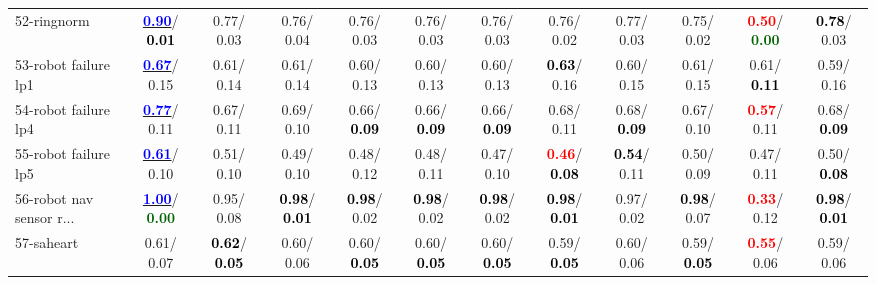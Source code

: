 \begin{table}[h]
\begin{center}
{\begin{tabular}{lc|c|c|c|c|c|c|c|c|c|c}
52-ringnorm & \underline{\textcolor{blue}{\textbf{  0.90}}}/\textcolor{black}{\textbf{  0.01}} &   0.77/  0.03 &   0.76/  0.04 &   0.76/  0.03 &   0.76/  0.03 &   0.76/  0.03 &   0.76/  0.02 &   0.77/  0.03 &   0.75/  0.02 & \textcolor{red}{\textbf{  0.50}}/\textcolor{darkgreen}{\textbf{  0.00}} & \textcolor{black}{\textbf{  0.78}}/  0.03 \\
53-robot failure lp1 & \underline{\textcolor{blue}{\textbf{  0.67}}}/  0.15 &   0.61/  0.14 &   0.61/  0.14 &   0.60/  0.13 &   0.60/  0.13 &   0.60/  0.13 & \textcolor{black}{\textbf{  0.63}}/  0.16 &   0.60/  0.15 &   0.61/  0.15 &   0.61/\textcolor{black}{\textbf{  0.11}} &   0.59/  0.16 \\ \hline
54-robot failure lp4 & \underline{\textcolor{blue}{\textbf{  0.77}}}/  0.11 &   0.67/  0.11 &   0.69/  0.10 &   0.66/\textcolor{black}{\textbf{  0.09}} &   0.66/\textcolor{black}{\textbf{  0.09}} &   0.66/\textcolor{black}{\textbf{  0.09}} &   0.68/  0.11 &   0.68/\textcolor{black}{\textbf{  0.09}} &   0.67/  0.10 & \textcolor{red}{\textbf{  0.57}}/  0.11 &   0.68/\textcolor{black}{\textbf{  0.09}} \\
55-robot failure lp5 & \underline{\textcolor{blue}{\textbf{  0.61}}}/  0.10 &   0.51/  0.10 &   0.49/  0.10 &   0.48/  0.12 &   0.48/  0.11 &   0.47/  0.10 & \textcolor{red}{\textbf{  0.46}}/\textcolor{black}{\textbf{  0.08}} & \textcolor{black}{\textbf{  0.54}}/  0.11 &   0.50/  0.09 &   0.47/  0.11 &   0.50/\textcolor{black}{\textbf{  0.08}} \\
56-robot nav sensor r... & \underline{\textcolor{blue}{\textbf{  1.00}}}/\textcolor{darkgreen}{\textbf{  0.00}} &   0.95/  0.08 & \textcolor{black}{\textbf{  0.98}}/\textcolor{black}{\textbf{  0.01}} & \textcolor{black}{\textbf{  0.98}}/  0.02 & \textcolor{black}{\textbf{  0.98}}/  0.02 & \textcolor{black}{\textbf{  0.98}}/  0.02 & \textcolor{black}{\textbf{  0.98}}/\textcolor{black}{\textbf{  0.01}} &   0.97/  0.02 & \textcolor{black}{\textbf{  0.98}}/  0.07 & \textcolor{red}{\textbf{  0.33}}/  0.12 & \textcolor{black}{\textbf{  0.98}}/\textcolor{black}{\textbf{  0.01}} \\
57-saheart &   0.61/  0.07 & \textcolor{black}{\textbf{  0.62}}/\textcolor{black}{\textbf{  0.05}} &   0.60/  0.06 &   0.60/\textcolor{black}{\textbf{  0.05}} &   0.60/\textcolor{black}{\textbf{  0.05}} &   0.60/\textcolor{black}{\textbf{  0.05}} &   0.59/\textcolor{black}{\textbf{  0.05}} &   0.60/  0.06 &   0.59/\textcolor{black}{\textbf{  0.05}} & \textcolor{red}{\textbf{  0.55}}/  0.06 &   0.59/  0.06 \\

\end{tabular}}
\end{center}
\end{table}
